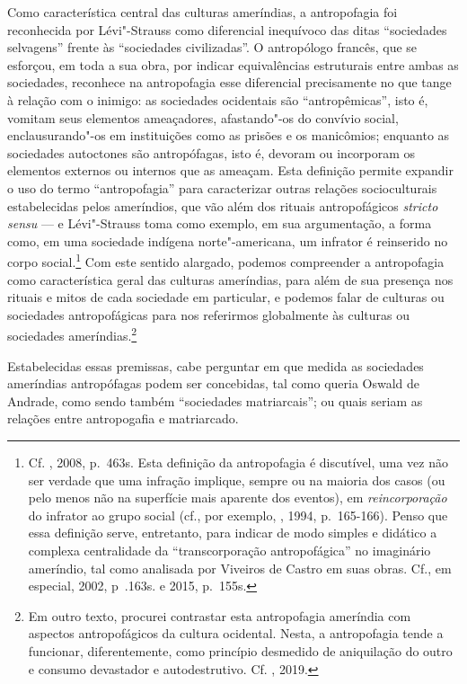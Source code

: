 Como característica central das culturas ameríndias, a antropofagia foi
reconhecida por Lévi"-Strauss como diferencial inequívoco das ditas
``sociedades selvagens'' frente às ``sociedades civilizadas''. O
antropólogo francês, que se esforçou, em toda a sua obra, por indicar
equivalências estruturais entre ambas as sociedades, reconhece na
antropofagia esse diferencial precisamente no que tange à relação com o
inimigo: as sociedades ocidentais são ``antropêmicas'', isto é, vomitam
seus elementos ameaçadores, afastando"-os do convívio social,
enclausurando"-os em instituições como as prisões e os manicômios;
enquanto as sociedades autoctones são antropófagas, isto é, devoram ou
incorporam os elementos externos ou internos que as ameaçam. Esta
definição permite expandir o uso do termo ``antropofagia'' para
caracterizar outras relações socioculturais estabelecidas pelos
ameríndios, que vão além dos rituais antropofágicos \emph{stricto sensu}
--- e Lévi"-Strauss toma como exemplo, em sua argumentação, a forma como,
em uma sociedade indígena norte"-americana, um infrator é reinserido no
corpo social.\footnote{Cf. , 2008, p.~463s. Esta definição da
  antropofagia é discutível, uma vez não ser verdade que uma infração
  implique, sempre ou na maioria dos casos (ou pelo menos não na
  superfície mais aparente dos eventos), em \emph{reincorporação} do
  infrator ao grupo social (cf., por exemplo, , 1994, p.~165-166).
  Penso que essa definição serve, entretanto, para indicar de modo
  simples e didático a complexa centralidade da ``transcorporação
  antropofágica'' no imaginário ameríndio, tal como analisada por
  Viveiros de Castro em suas obras. Cf., em especial, 
  2002, p~.163s. e 2015, p.~155s.} Com este sentido alargado, podemos
compreender a antropofagia como característica geral das culturas
ameríndias, para além de sua presença nos rituais e mitos de cada
sociedade em particular, e podemos falar de culturas ou sociedades
antropofágicas para nos referirmos globalmente às culturas ou sociedades
ameríndias.\footnote{Em outro texto, procurei contrastar esta
  antropofagia ameríndia com aspectos antropofágicos da cultura
  ocidental. Nesta, a antropofagia tende a funcionar, diferentemente,
  como princípio desmedido de aniquilação do outro e consumo devastador
  e autodestrutivo. Cf. , 2019.}

Estabelecidas essas premissas, cabe perguntar em que medida as
sociedades ameríndias antropófagas podem ser concebidas, tal como queria
Oswald de Andrade, como sendo também ``sociedades matriarcais''; ou
quais seriam as relações entre antropogafia e matriarcado.

